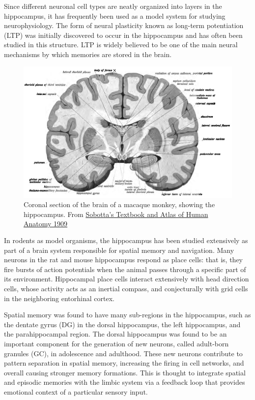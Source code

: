 Since different neuronal cell types are neatly organized into layers in the hippocampus, it has frequently been used as a model system for studying neurophysiology. The form of neural plasticity known as long-term potentiation (LTP) was initially discovered to occur in the hippocampus and has often been studied in this structure. LTP is widely believed to be one of the main neural mechanisms by which memories are stored in the brain.



\begin{figure}

{\centering \includegraphics[width=0.7\linewidth]{./figures/cns/Sobo_1909_646} 

}

\caption{Coronal section of the brain of a macaque monkey, showing the hippocampus. From \href{https://commons.wikimedia.org/wiki/File:Sobo_1909_634.png}{Sobotta's Textbook and Atlas of Human Anatomy 1909}}\label{fig:hippocross}
\end{figure}

In rodents as model organisms, the hippocampus has been studied extensively as part of a brain system responsible for spatial memory and navigation. Many neurons in the rat and mouse hippocampus respond as place cells: that is, they fire bursts of action potentials when the animal passes through a specific part of its environment. Hippocampal place cells interact extensively with head direction cells, whose activity acts as an inertial compass, and conjecturally with grid cells in the neighboring entorhinal cortex.

Spatial memory was found to have many sub-regions in the hippocampus, such as the dentate gyrus (DG) in the dorsal hippocampus, the left hippocampus, and the parahippocampal region. The dorsal hippocampus was found to be an important component for the generation of new neurons, called adult-born granules (GC), in adolescence and adulthood. These new neurons contribute to pattern separation in spatial memory, increasing the firing in cell networks, and overall causing stronger memory formations. This is thought to integrate spatial and episodic memories with the limbic system via a feedback loop that provides emotional context of a particular sensory input.



